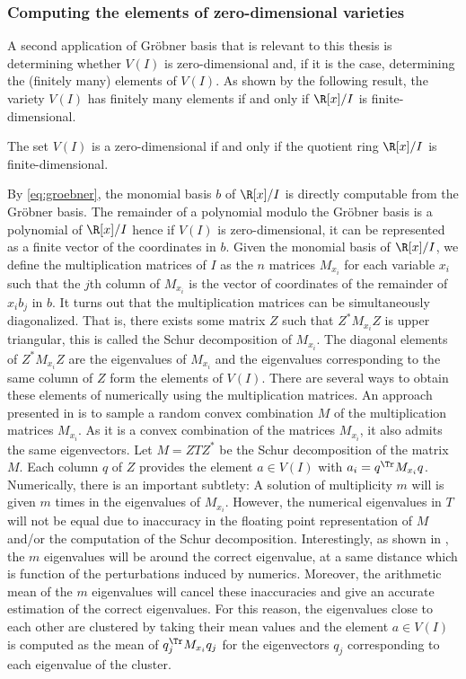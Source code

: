 \documentclass[11pt,twoside,a4paper,openright]{uclouvain-thesis}
\begin{document}
\subsubsection{Computing the elements of zero-dimensional varieties}
\label{sec:solvealg}

A second application of Gröbner basis that is relevant to this thesis is
determining whether $V(I)$ is zero-dimensional and,
if it is the case, determining the (finitely many) elements of $V(I)$.
As shown by the following result, the variety $V(I)$ has finitely many elements
if and only if $\R[x] / I$ is finite-dimensional.

\begin{mytheo}
  The set $V(I)$ is a zero-dimensional if and only if
  the quotient ring $\R[x] / I$ is finite-dimensional.
\end{mytheo}

By \eqref{eq:groebner}, the monomial basis $b$ of $\R[x] / I$ is directly computable
from the Gr\"{o}bner basis.
The remainder of a polynomial modulo the Gr\"{o}bner basis is a polynomial of $\R[x] / I$
hence if $V(I)$ is zero-dimensional, it can be represented as a finite vector of the coordinates in $b$.
Given the monomial basis of $\R[x] / I$, we define the multiplication matrices
of $I$ as the $n$ matrices $M_{x_i}$ for each variable $x_i$ such that
the $j$th column of $M_{x_i}$ is the vector of coordinates of the remainder
of $x_i b_j$ in $b$.
It turns out that the multiplication matrices can be simultaneously diagonalized.
That is, there exists some matrix $Z$ such that $Z^* M_{x_i} Z$ is upper triangular,
this is called the Schur decomposition of $M_{x_i}$.
The diagonal elements of $Z^* M_{x_i} Z$ are the eigenvalues of $M_{x_i}$ and
the eigenvalues corresponding to the same column of $Z$ form the elements of $V(I)$.
There are several ways to obtain these elements of numerically using the multiplication
matrices.
An approach presented in \cite{manocha1995algorithms} is to sample a random convex combination $M$ of the multiplication matrices $M_{x_i}$.
As it is a convex combination of the matrices $M_{x_i}$, it also admits the same eigenvectors.
Let $M = Z T Z^*$ be the Schur decomposition of the matrix $M$.
Each column $q$ of $Z$ provides the element $a \in V(I)$ with $a_i = q^\Tr M_{x_i} q$.
Numerically, there is an important subtlety:
A solution of multiplicity $m$ will is given $m$ times in the eigenvalues of $M_{x_i}$.
However, the numerical eigenvalues in $T$ will not be equal due to inaccuracy in the floating point representation of $M$ and/or the computation of the Schur decomposition.
Interestingly, as shown in \cite[Section~4.1]{manocha1995algorithms},
the $m$ eigenvalues will be around the correct eigenvalue, at a same distance which is function of the perturbations induced by numerics.
Moreover, the arithmetic mean of the $m$ eigenvalues will cancel these inaccuracies and give an accurate estimation of the correct eigenvalues.
For this reason, the eigenvalues close to each other are clustered by taking their mean values and
the element $a \in V(I)$ is computed as the mean of $q_j^\Tr M_{x_i} q_j$ for the eigenvectors $q_j$ corresponding to each eigenvalue of the cluster.
\end{document}
